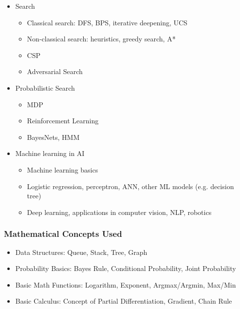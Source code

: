 {\begin{highlight}[\CSPBAI]
        \begin{itemize}
            \item Search
            \begin{itemize}
                \item Classical search: DFS, BPS, iterative deepening, UCS
                \item Non-classical search: heuristics, greedy search, A*
                \item CSP
                \item Adversarial Search
            \end{itemize}
            \item Probabilistic Search
            \begin{itemize}
                \item MDP
                \item Reinforcement Learning
                \item BayesNets, HMM
            \end{itemize}
            \item Machine learning in AI
            \begin{itemize}
                \item Machine learning basics
                \item Logistic regression, perceptron, ANN, other ML models (e.g. decision tree)
                \item Deep learning, applications in computer vision, NLP, robotics
            \end{itemize}
        \end{itemize}
        
        \subsubsection*{Mathematical Concepts Used}
        
        \begin{itemize}
            \item Data Structures: Queue, Stack, Tree, Graph
            \item Probability Basics: Bayes Rule, Conditional Probability, Joint Probability
            \item Basic Math Functions: Logarithm, Exponent, Argmax/Argmin, Max/Min
            \item Basic Calculus: Concept of Partial Differentiation, Gradient, Chain Rule
        \end{itemize}
    \end{highlight}
}

